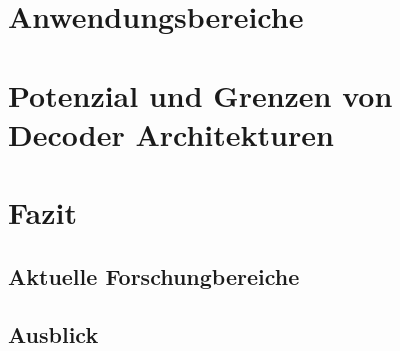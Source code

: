 \documentclass[conference]{IEEEtran}
\begin{document}
\section{Anwendungsbereiche}

\section{Potenzial und Grenzen von Decoder Architekturen}


\section{Fazit}
\subsection{Aktuelle Forschungbereiche}
\subsection{Ausblick}





\end{document}
